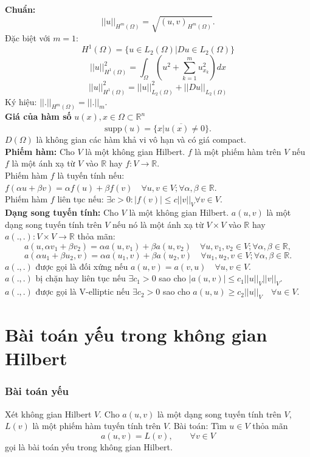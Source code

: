 \documentclass[
12pt, %
oneside, %
english, %
onehalfspacing, %
nolistspacing, %
headsepline, %
addchap,
]{MastersDoctoralThesis} %
\begin{document}
\textbf{Chuẩn:}
$$||u||_{H^m(\Omega)}=\sqrt{(u,v)_{H^m(\Omega)}}.$$
Đặc biệt với $m=1$:
$$H^1(\Omega)=\{u\in L_2(\Omega)|Du\in L_2(\Omega)\}$$
$$||u||^2_{H^1(\Omega)}=\int_\Omega (u^2+\sum_{k=1}^mu^2_{x_k})dx$$
$$||u||^2_{H^1(\Omega)}=||u||^2_{L_2(\Omega)}+||Du||_{L_2(\Omega)}$$
Ký hiệu: $||.||_{H^m(\Omega)}=||.||_m$.\\
\textbf{Giá của hàm số} $u(x), x\in\Omega\subset\mathbb{R}^n$
$$\text{supp}(u)=\overline{\{x|u(x)\neq 0\}}.$$
$D(\Omega)$ là không gian các hàm khả vi vô hạn và có giá compact.\\
\textbf{Phiếm hàm:} Cho $V$ là một không gian Hilbert. $f$ là một phiếm hàm trên $V$ nếu $f$ là một ánh xạ từ $V$ vào $\mathbb{R}$ hay $f:V\rightarrow\mathbb{R}$.\\
Phiếm hàm $f$ là tuyến tính nếu: $f(\alpha u+\beta v)=\alpha f(u)+\beta f(v) \quad \forall u,v\in V;\forall \alpha,\beta \in \mathbb{R}$.\\
Phiếm hàm $f$ liên tục nếu: $\exists c>0:|f(v)|\leq c||v||_V \forall v\in V$.\\
\textbf{Dạng song tuyến tính:} Cho $V$ là một không gian Hilbert. $a(u,v)$ là một dạng song tuyến tính trên $V$ nếu nó là một ánh xạ từ $V\times V$ vào $\mathbb{R}$ hay $a(.,.):V\times V\rightarrow \mathbb{R}$ thỏa mãn:
$$a(u, \alpha v_1+\beta v_2) = \alpha a(u,v_1)+\beta a(u,v_2) \quad \forall u,v_1,v_2\in V;\forall \alpha,\beta \in \mathbb{R},$$
$$a(\alpha u_1+\beta u_2,v) = \alpha a(u_1,v)+\beta a(u_2,v) \quad \forall u_1,u_2,v\in V;\forall \alpha,\beta \in \mathbb{R}.$$
$a(.,.)$ được gọi là đối xứng nếu $a(u,v)=a(v,u) \quad \forall u,v\in V$.\\
$a(.,.)$ bị chặn hay liên tục nếu $\exists c_1>0$ sao cho $|a(u,v)|\leq c_1||u||_V||v||_V$.\\
$a(.,.)$ được gọi là V-elliptic nếu $\exists c_2>0$ sao cho $a(u,u)\geq c_2||u||_V\quad\forall u\in V$.
\section{Bài toán yếu trong không gian Hilbert}
\subsubsection*{Bài toán yếu}
Xét không gian Hilbert $V$. Cho $a(u,v)$ là một dạng song tuyến tính trên $V$, $L(v)$ là một phiếm hàm tuyến tính trên $V$. Bài toán: Tìm $u\in V$ thỏa mãn
\begin{equation}\label{eq:bty}
a(u,v) = L(v), \qquad \forall v\in V
\end{equation}
gọi là bài toán yếu trong không gian Hilbert.
\end{document}
